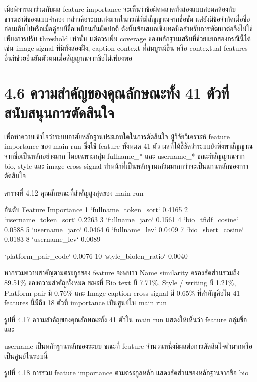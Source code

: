 \documentclass[12pt,a4paper]{report}
\begin{document}
\clearpage
เมื่อพิจารณาร่วมกับผล feature importance จะเห็นว่าข้อผิดพลาดทั้งสองแบบสอดคล้องกับธรรมชาติของแบบจำลอง กล่าวคือระบบเก่งมากในกรณีที่มีสัญญาณจากชื่อชัด แต่ยังมีข้อจำกัดเมื่อชื่ออ่อนเกินไปหรือเมื่อคู่ลบมีชื่อเหมือนกันผิดปกติ ดังนั้นข้อเสนอเชิงเทคนิคสำหรับการพัฒนาต่อจึงไม่ใช่เพียงการปรับ threshold เท่านั้น แต่ควรเพิ่ม coverage ของหลักฐานเสริมที่ช่วยแยกสองกรณีนี้ได้ เช่น image signal ที่มีทั้งสองฝั่ง, caption-context ที่สมบูรณ์ขึ้น หรือ contextual features อื่นที่ช่วยยืนยันตัวตนเมื่อสัญญาณจากชื่อไม่เพียงพอ\par
\section*{4.6 ความสำคัญของคุณลักษณะทั้ง 41 ตัวที่สนับสนุนการตัดสินใจ}
เพื่อทำความเข้าใจว่าระบบอาศัยหลักฐานประเภทใดในการตัดสินใจ ผู้วิจัยวิเคราะห์ feature importance ของ main run ซึ่งใช้ feature ทั้งหมด 41 ตัว ผลที่ได้ชี้ชัดว่าระบบยังพึ่งพาสัญญาณจากชื่อเป็นหลักอย่างมาก โดยเฉพาะกลุ่ม fullname\_* และ username\_* ขณะที่สัญญาณจาก bio, style และ image-cross-signal ทำหน้าที่เป็นหลักฐานเสริมมากกว่าจะเป็นแกนหลักของการตัดสินใจ\par
\begin{center}\small ตารางที่ 4.12 คุณลักษณะที่สำคัญสูงสุดของ main run\end{center}
อันดับ Feature Importance 1 `fullname\_token\_sort` 0.4165 2 `username\_token\_sort` 0.2263 3 `fullname\_jaro` 0.1561 4 `bio\_tfidf\_cosine` 0.0588 5 `username\_jaro` 0.0464 6 `fullname\_lev` 0.0409 7 `bio\_sbert\_cosine` 0.0183 8 `username\_lev` 0.0089\par
 `platform\_pair\_code` 0.0076 10 `style\_biolen\_ratio` 0.0040\par
หากรวมความสำคัญตามตระกูลของ feature จะพบว่า Name similarity ครองสัดส่วนรวมถึง 89.51\% ของความสำคัญทั้งหมด ขณะที่ Bio text มี 7.71\%, Style / writing มี 1.21\%, Platform pair มี 0.76\% และ Image-caption cross-signal มี 0.65\% ที่สำคัญคือใน 41 features นี้มีถึง 18 ตัวที่ importance เป็นศูนย์ใน main run\par
\begin{center}\small รูปที่ 4.17 ความสำคัญของคุณลักษณะทั้ง 41 ตัวใน main run แสดงให้เห็นว่า feature กลุ่มชื่อและ\end{center}
username เป็นหลักฐานหลักของระบบ ขณะที่ feature จำนวนหนึ่งมีผลต่อการตัดสินใจต่ำมากหรือเป็นศูนย์ในรอบนี้\par
\clearpage
\begin{center}\small รูปที่ 4.18 การรวม feature importance ตามตระกูลหลัก แสดงสัดส่วนของหลักฐานจากชื่อ bio\end{center}
\end{document}
